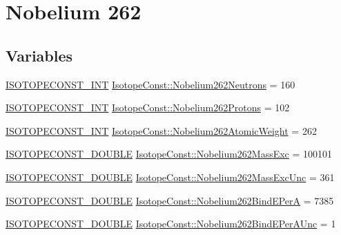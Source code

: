 \hypertarget{group___isotope_const-_nobelium-_no262}{}\section{Nobelium 262}
\label{group___isotope_const-_nobelium-_no262}
\subsection*{Variables}
\begin{DoxyCompactItemize}
\item 
\mbox{\hyperlink{group___isotope_const-_macros_ga5f18360b3e99483a35c32d789e62621c}{I\+S\+O\+T\+O\+P\+E\+C\+O\+N\+S\+T\+\_\+\+I\+NT}} \mbox{\hyperlink{group___isotope_const-_nobelium-_no262_ga9559a4f2f26b9ecb19949374600c7bfa}{Isotope\+Const\+::\+Nobelium262\+Neutrons}} = 160
\item 
\mbox{\hyperlink{group___isotope_const-_macros_ga5f18360b3e99483a35c32d789e62621c}{I\+S\+O\+T\+O\+P\+E\+C\+O\+N\+S\+T\+\_\+\+I\+NT}} \mbox{\hyperlink{group___isotope_const-_nobelium-_no262_ga963ecc5606fb33637557579c5fcd7530}{Isotope\+Const\+::\+Nobelium262\+Protons}} = 102
\item 
\mbox{\hyperlink{group___isotope_const-_macros_ga5f18360b3e99483a35c32d789e62621c}{I\+S\+O\+T\+O\+P\+E\+C\+O\+N\+S\+T\+\_\+\+I\+NT}} \mbox{\hyperlink{group___isotope_const-_nobelium-_no262_ga644de0d49b7499df7bc433c477e89ed9}{Isotope\+Const\+::\+Nobelium262\+Atomic\+Weight}} = 262
\item 
\mbox{\hyperlink{group___isotope_const-_macros_ga8f45a7272ce02c0b4c65c44636ed719a}{I\+S\+O\+T\+O\+P\+E\+C\+O\+N\+S\+T\+\_\+\+D\+O\+U\+B\+LE}} \mbox{\hyperlink{group___isotope_const-_nobelium-_no262_ga17291cb2a28931f695c95bdbeff1c7dc}{Isotope\+Const\+::\+Nobelium262\+Mass\+Exc}} = 100101
\item 
\mbox{\hyperlink{group___isotope_const-_macros_ga8f45a7272ce02c0b4c65c44636ed719a}{I\+S\+O\+T\+O\+P\+E\+C\+O\+N\+S\+T\+\_\+\+D\+O\+U\+B\+LE}} \mbox{\hyperlink{group___isotope_const-_nobelium-_no262_gab43c41b617c7bdcb82f6cc120a5556a4}{Isotope\+Const\+::\+Nobelium262\+Mass\+Exc\+Unc}} = 361
\item 
\mbox{\hyperlink{group___isotope_const-_macros_ga8f45a7272ce02c0b4c65c44636ed719a}{I\+S\+O\+T\+O\+P\+E\+C\+O\+N\+S\+T\+\_\+\+D\+O\+U\+B\+LE}} \mbox{\hyperlink{group___isotope_const-_nobelium-_no262_gaed9fc74e3b83ee3f3cfb6de76081f53d}{Isotope\+Const\+::\+Nobelium262\+Bind\+E\+PerA}} = 7385
\item 
\mbox{\hyperlink{group___isotope_const-_macros_ga8f45a7272ce02c0b4c65c44636ed719a}{I\+S\+O\+T\+O\+P\+E\+C\+O\+N\+S\+T\+\_\+\+D\+O\+U\+B\+LE}} \mbox{\hyperlink{group___isotope_const-_nobelium-_no262_ga9c4dde931456f0653ecd7a01da6a2030}{Isotope\+Const\+::\+Nobelium262\+Bind\+E\+Per\+A\+Unc}} = 1

\end{DoxyCompactItemize}
